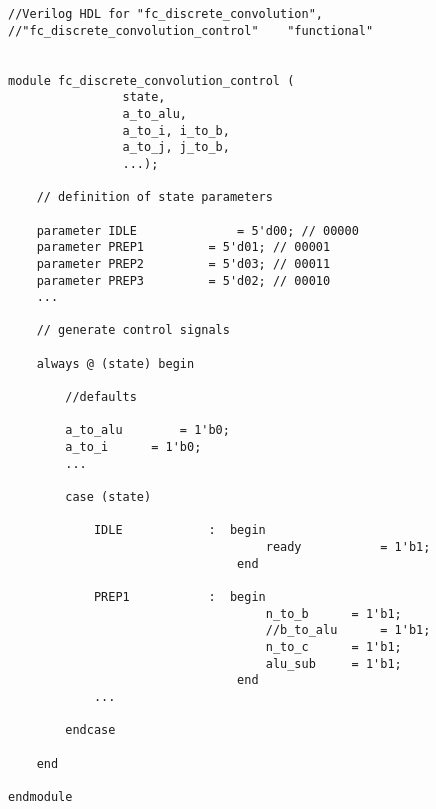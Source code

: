 
\lstset{language=Verilog, tabsize=3} %
\begin{lstlisting}
//Verilog HDL for "fc_discrete_convolution", 
//"fc_discrete_convolution_control"    "functional"


module fc_discrete_convolution_control (
				state,
				a_to_alu,
				a_to_i, i_to_b,
				a_to_j, j_to_b,
				...);
	
	// definition of state parameters
	
	parameter IDLE				= 5'd00; // 00000
	parameter PREP1			= 5'd01; // 00001
	parameter PREP2			= 5'd03; // 00011
	parameter PREP3			= 5'd02; // 00010
	...
	
	// generate control signals
	
	always @ (state) begin
		
		//defaults
		
		a_to_alu		= 1'b0;
		a_to_i		= 1'b0;
		...	
		
		case (state)
		
			IDLE			:  begin
									ready			= 1'b1;
								end
			
			PREP1			:  begin
									n_to_b		= 1'b1;
									//b_to_alu		= 1'b1;
									n_to_c		= 1'b1;
									alu_sub		= 1'b1;
								end
			...	
			
		endcase
		
	end
	
endmodule
\end{lstlisting}